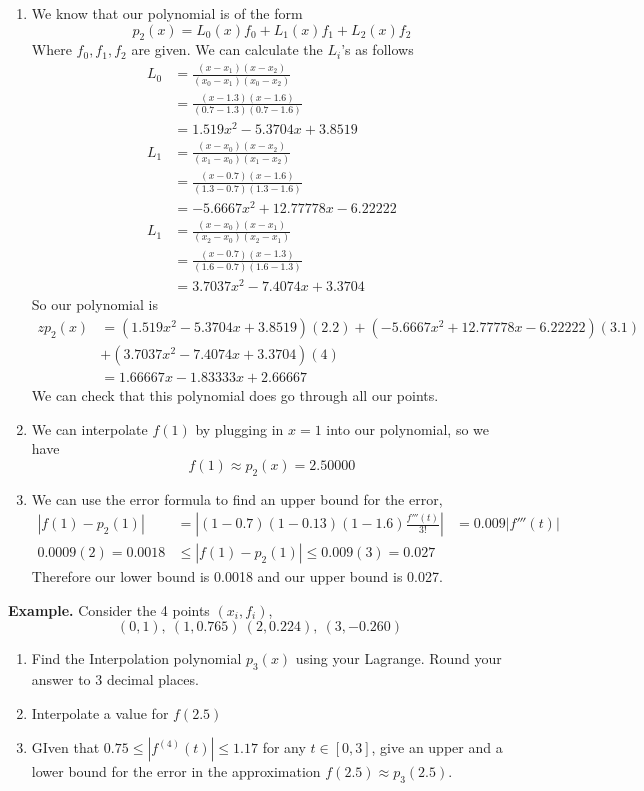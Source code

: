 \documentclass[openany]{report}
\begin{document}
\begin{enumerate}[label=(\roman*)]
    \item We know that our polynomial is of the form
    \[p_2(x) = L_0(x) f_0 + L_1(x)f_1 + L_2(x)f_2\]
    Where $f_0,f_1,f_2$ are given. We can calculate the $L_i$'s as follows
    \begin{align*}
        L_0 &= \frac{(x - x_1)(x-x_2)}{(x_0 - x_1)(x_0-x_2)}\\
        &= \frac{(x-1.3)(x-1.6)}{(0.7 - 1.3)(0.7-1.6)}\\
        &= 1.519x^2 - 5.3704x + 3.8519\\
        L_1 &= \frac{(x - x_0)(x-x_2)}{(x_1 - x_0)(x_1-x_2)}\\
        &= \frac{(x-0.7)(x-1.6)}{(1.3-0.7)(1.3-1.6)}\\
        &= -5.6667x^2 + 12.77778x - 6.22222\\
        L_1 &= \frac{(x - x_0)(x-x_1)}{(x_2 - x_0)(x_2-x_1)}\\
        &= \frac{(x-0.7)(x-1.3)}{(1.6-0.7)(1.6-1.3)}\\
        &= 3.7037x^2 - 7.4074x + 3.3704
    \end{align*}
    So our polynomial is
    \begin{align*}z
        p_2(x) &= (1.519x^2 - 5.3704x + 3.8519)(2.2) + (-5.6667x^2 + 12.77778x - 6.22222)(3.1) \\
        &+ (3.7037x^2 - 7.4074x + 3.3704)(4)\\
        &= 1.66667x - 1.83333x + 2.66667
    \end{align*}
    We can check that this polynomial does go through all our points.
    \item We can interpolate $f(1)$ by plugging in $x = 1$ into our polynomial, so we have
    \[f(1) \approx p_2(x) = 2.50000\]
    \item We can use the error formula to find an upper bound for the error,
    \begin{align*}
        |f(1) - p_2(1)| &= \left|(1 - 0.7)(1-0.13)(1-1.6)\frac{f'''(t)}{3!}\right|
        &= 0.009 |f'''(t)|\\
        0.0009(2) = 0.0018 &\leq |f(1) - p_2(1)| \leq 0.009(3) = 0.027
    \end{align*}
    Therefore our lower bound is 0.0018 and our upper bound is 0.027.
\end{enumerate}
\textbf{Example.} Consider the 4 points $(x_i,f_i)$, 
\[(0,1), \ (1,0.765) \ (2,0.224), \ (3, -0.260) \]
\begin{enumerate}[label=(\roman*)]
    \item Find the Interpolation polynomial $p_3(x)$ using your Lagrange. Round your answer to 3 decimal places.
    \item Interpolate a value for $f(2.5)$
    \item GIven that $0.75 \leq |f^{(4)}(t)| \leq 1.17$ for any $t \in [0,3]$, give an upper and a lower bound for the error in the approximation $f(2.5) \approx p_3(2.5)$.
\end{enumerate}
\end{document}
